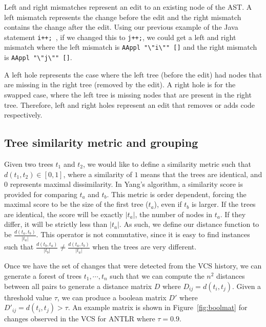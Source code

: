 Left and right mismatches represent an edit to an existing node of the AST\@.
A left mismatch represents the change before the edit and the right mismatch
contains the change after the edit.  Using our previous example of the Java
statement {\tt i++; }, if we changed this to {\tt j++;}, we could get a left
and right mismatch where the left mismatch is {\tt AAppl
"\textbackslash"i\textbackslash"" []} and the right mismatch is {\tt AAppl
"\textbackslash"j\textbackslash"" []}. 

A left hole represents the case where the left tree (before the edit) had nodes
that are missing in the right tree (removed by the edit). A right hole is for
the swapped case, where the left tree is missing nodes that are present in the
right tree. Therefore, left and right holes represent an edit that removes or
adds code respectively.

\subsection{Tree similarity metric and grouping}

Given two trees $t_1$ and $t_2$, we would like to define a similarity metric
such that $d(t_1, t_2) \in [0,1]$, where a similarity of $1$ means that the
trees are identical, and $0$ represents maximal dissimilarity.  In Yang's
algorithm, a similarity score is provided for comparing $t_a$ and $t_b$. This
metric is order dependent, forcing the maximal score to be the size of the
first tree ($t_a$), even if $t_b$ is larger.  If the trees are identical, the
score will be exactly $|t_a|$, the number of nodes in $t_a$.  If they differ,
it will be strictly less than $|t_a|$.  As such, we define our distance
function to be $\frac{d(t_a, t_b)}{|t_a|}$.  This operator is not commutative,
since it is easy to find instances such that $\frac{d(t_b, t_a)}{|t_b|} \neq
\frac{d(t_a, t_b)}{|t_a|}$ when the trees are very different.

Once we have the set of changes that were detected from the VCS history,
we can generate a forest of trees $t_1, \cdots, t_n$ such that we can
compute the $n^2$ distances between all pairs to generate a distance matrix
$D$ where $D_{ij} = d(t_i, t_j)$.  Given a threshold value $\tau$, we can
produce a boolean matrix $D'$ where $D'_{ij} = d(t_i, t_j) > \tau$.  An
example matrix is shown in Figure~\ref{fig:boolmat} for changes observed
in the VCS for ANTLR where $\tau = 0.9$.  

